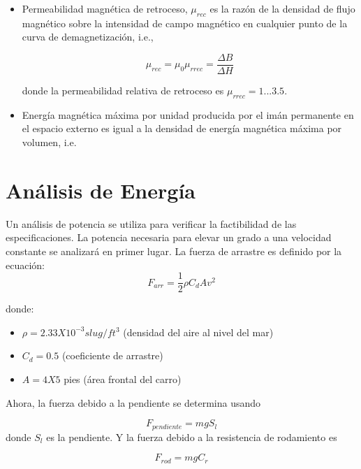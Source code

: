 \documentclass[12pt]{book}
\theoremstyle{definition}
\theoremstyle{remark}
\theoremstyle{plain}
\begin{document}
\begin{itemize}
\item Permeabilidad magnética de retroceso, $\mu_{rec}$ es la razón de la densidad de flujo magnético sobre la intensidad de campo magnético en cualquier punto de la curva de demagnetización, i.e.,

\begin{equation}
\label{equ304}
\mu _{rec} = \mu _0 \mu_{rrec}= \frac{\Delta B}{\Delta H}
\end{equation}

donde la permeabilidad relativa de retroceso es $\mu _{rrec}=1...3.5$.

\item Energía magnética máxima por unidad producida por el imán permanente en el espacio externo es igual a  la densidad de energía magnética máxima por volumen, i.e.



\end{itemize} 



\chapter{Análisis de Energía}
Un análisis de potencia se utiliza para verificar la factibilidad de las especificaciones. La potencia necesaria para elevar un grado a una velocidad constante se analizará en primer lugar. La fuerza de arrastre es definido por la ecuación:
\begin{equation}
\label{equ200}
F_{arr}=\frac{1}{2} \rho C_d A v^2
\end{equation}

donde:

\begin{itemize}
\item $\rho = 2.33X10^{-3}  slug/ft^3$ (densidad del aire al nivel del mar)
\item $C_d=0.5$ (coeficiente de arrastre)
\item $A= 4X5$ pies (área frontal del carro)
\end{itemize}

Ahora, la fuerza debido a la pendiente se determina usando

\begin{equation}
\label{equ201}
F_{pendiente}= m g S_l
\end{equation}
donde $S_l$ es la pendiente. Y la fuerza debido a la resistencia de rodamiento es

\begin{equation}
\label{equ202}
F_{rod}= m g C_r
\end{equation}
\end{document}
